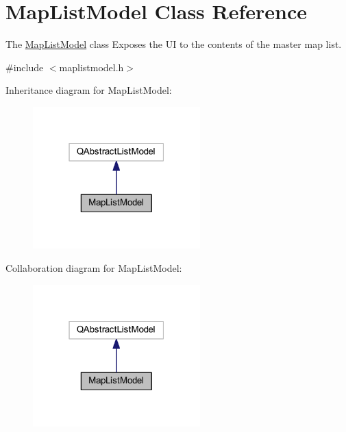 \hypertarget{class_map_list_model}{\section{Map\+List\+Model Class Reference}
\label{class_map_list_model}
}


The \hyperlink{class_map_list_model}{Map\+List\+Model} class Exposes the U\+I to the contents of the master map list.  




{\ttfamily \#include $<$maplistmodel.\+h$>$}



Inheritance diagram for Map\+List\+Model\+:\nopagebreak
\begin{figure}[H]
\begin{center}
\leavevmode
\includegraphics[width=183pt]{class_map_list_model__inherit__graph}
\end{center}
\end{figure}


Collaboration diagram for Map\+List\+Model\+:\nopagebreak
\begin{figure}[H]
\begin{center}
\leavevmode
\includegraphics[width=183pt]{class_map_list_model__coll__graph}
\end{center}
\end{figure}

